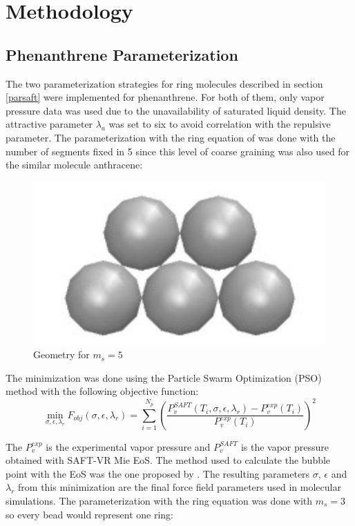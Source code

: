 \chapter{Methodology} %

\label{Chapter4} %

\section{Phenanthrene Parameterization}\label{parame}

The two parameterization strategies for ring molecules described in section \ref{parsaft} were implemented for phenanthrene. For both of them, only vapor pressure data \cite{pvphen} was used due to the unavailability of saturated liquid density. The attractive parameter $\lambda _{a}$ was set to six to avoid correlation with the repulsive parameter. The parameterization with the ring equation of  was done with the number of segments fixed in 5 since this level of coarse graining was also used for the similar molecule anthracene:
\begin{figure}[th]
\centering
\includegraphics[width=0.25\linewidth]{Figures/fen5}
\caption{Geometry for $m_{s}=5$}
\label{fig:fen5}
\end{figure}

The minimization was done using the Particle Swarm Optimization (PSO) method with the following objective function:
\begin{equation}
\min\limits_{\sigma,\epsilon,\lambda_{r}} F_{obj}(\sigma,\epsilon,\lambda_{r})= \sum_{i=1}^{N_{p}} \left(\frac{P_{v}^{SAFT}(T_{i},\sigma,\epsilon,\lambda_{r})-P_{v}^{exp}(T_{i})}{P_{v}^{exp}(T_{i})} \right)^2
\label{eqn:fobjm}
\end{equation}

The $P_{v}^{exp}$ is the experimental vapor pressure and $P_{v}^{SAFT}$ is the vapor pressure obtained with SAFT-VR Mie EoS. The method used to calculate the bubble point with the EoS was the one proposed by . The resulting  parameters $\sigma$, $\epsilon $ and $\lambda _{r}$ from this minimization are the final force field parameters used in molecular simulations. The parameterization with the  ring equation was done with $m_{s}=3$ so every bead would represent one ring:

